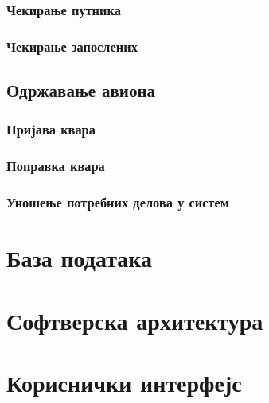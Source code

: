\documentclass{article}
\begin{document}
\subsubsection{Чекирање путника}

\subsubsection{Чекирање запослених}

\subsection{Одржавање авиона}

\subsubsection{Пријава квара}

\subsubsection{Поправка квара}

\subsubsection{Уношење потребних делова у систем}

\section{База података}

\section{Софтверска архитектура}

\section{Кориснички интерфејс}

\newpage

 
\end{document}

